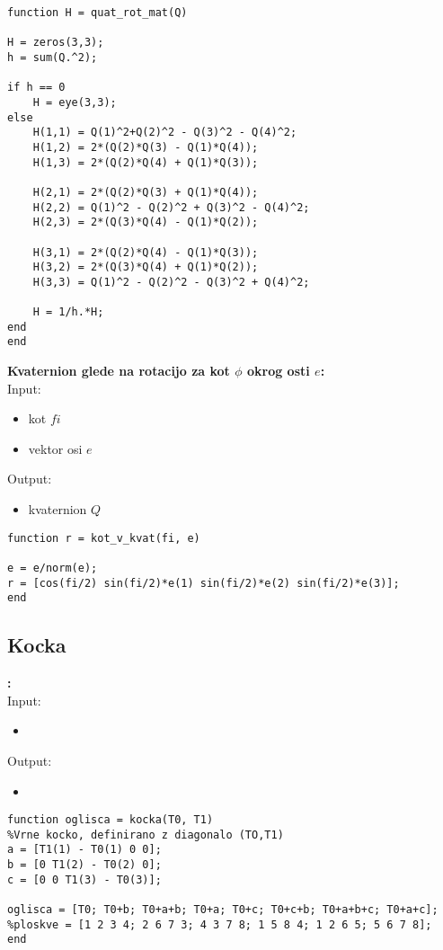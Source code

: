 \documentclass[12pt,a4paper,twoside]{article}
\theoremstyle{definition} %
\theoremstyle{plain} %
\numberwithin{equation}{section}  %
\begin{document}
\begin{lstlisting}[caption = {quat\_rot\_mat}]
function H = quat_rot_mat(Q)

H = zeros(3,3);
h = sum(Q.^2);

if h == 0
    H = eye(3,3);
else
    H(1,1) = Q(1)^2+Q(2)^2 - Q(3)^2 - Q(4)^2;
    H(1,2) = 2*(Q(2)*Q(3) - Q(1)*Q(4));
    H(1,3) = 2*(Q(2)*Q(4) + Q(1)*Q(3));

    H(2,1) = 2*(Q(2)*Q(3) + Q(1)*Q(4));
    H(2,2) = Q(1)^2 - Q(2)^2 + Q(3)^2 - Q(4)^2;
    H(2,3) = 2*(Q(3)*Q(4) - Q(1)*Q(2));

    H(3,1) = 2*(Q(2)*Q(4) - Q(1)*Q(3));
    H(3,2) = 2*(Q(3)*Q(4) + Q(1)*Q(2));
    H(3,3) = Q(1)^2 - Q(2)^2 - Q(3)^2 + Q(4)^2;

    H = 1/h.*H;  
end
end
\end{lstlisting}

\vspace{1cm}
\textbf{Kvaternion glede na rotacijo za kot $\phi$ okrog osti $e$:}\\
Input:
\begin{itemize}
\item kot $fi$
\item vektor osi $e$
\end{itemize}
Output:
\begin{itemize}
\item kvaternion $Q$
\end{itemize}

\begin{lstlisting}[caption = {kot\_v\_kvat}]
function r = kot_v_kvat(fi, e)

e = e/norm(e);
r = [cos(fi/2) sin(fi/2)*e(1) sin(fi/2)*e(2) sin(fi/2)*e(3)];
end
\end{lstlisting}

\newpage

\subsection{Kocka}

\vspace{1cm}
\textbf{:}\\
Input:
\begin{itemize}
\item 
\end{itemize}
Output:
\begin{itemize}
\item 
\end{itemize}

\begin{lstlisting}[caption = {\color{green} kocka}]
function oglisca = kocka(T0, T1)
%Vrne kocko, definirano z diagonalo (TO,T1)
a = [T1(1) - T0(1) 0 0];
b = [0 T1(2) - T0(2) 0];
c = [0 0 T1(3) - T0(3)];

oglisca = [T0; T0+b; T0+a+b; T0+a; T0+c; T0+c+b; T0+a+b+c; T0+a+c];
%ploskve = [1 2 3 4; 2 6 7 3; 4 3 7 8; 1 5 8 4; 1 2 6 5; 5 6 7 8]; 
end
\end{lstlisting}
\end{document}
